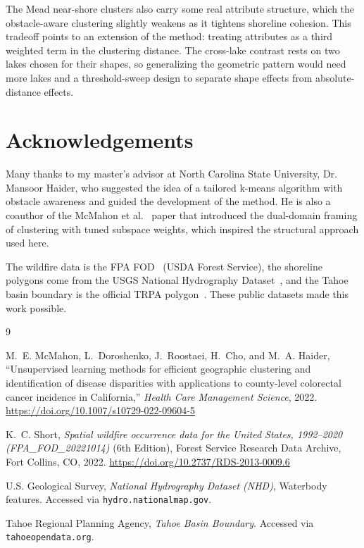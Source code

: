 \documentclass[11pt]{article}
\begin{document}
The Mead near-shore clusters also carry some real attribute structure, which the obstacle-aware clustering slightly weakens as it tightens shoreline cohesion. This tradeoff points to an extension of the method: treating attributes as a third weighted term in the clustering distance. The cross-lake contrast rests on two lakes chosen for their shapes, so generalizing the geometric pattern would need more lakes and a threshold-sweep design to separate shape effects from absolute-distance effects.

\section*{Acknowledgements}

Many thanks to my master's advisor at North Carolina State University, Dr. Mansoor Haider, who suggested the idea of a tailored k-means algorithm with obstacle awareness and guided the development of the method. He is also a coauthor of the McMahon et al.~\cite{mcmahon2022} paper that introduced the dual-domain framing of clustering with tuned subspace weights, which inspired the structural approach used here.

The wildfire data is the FPA FOD~\cite{fpafod} (USDA Forest Service), the shoreline polygons come from the USGS National Hydrography Dataset~\cite{nhd}, and the Tahoe basin boundary is the official TRPA polygon~\cite{trpa}. These public datasets made this work possible.

\begin{thebibliography}{9}

M.~E. McMahon, L.~Doroshenko, J.~Roostaei, H.~Cho, and M.~A. Haider,
``Unsupervised learning methods for efficient geographic clustering and identification of disease disparities with applications to county-level colorectal cancer incidence in California,''
\emph{Health Care Management Science}, 2022. \url{https://doi.org/10.1007/s10729-022-09604-5}

K.~C. Short,
\emph{Spatial wildfire occurrence data for the United States, 1992--2020 (FPA\_FOD\_20221014)} (6th Edition), Forest Service Research Data Archive, Fort Collins, CO, 2022. \url{https://doi.org/10.2737/RDS-2013-0009.6}

U.S. Geological Survey,
\emph{National Hydrography Dataset (NHD)}, Waterbody features. Accessed via \texttt{hydro.nationalmap.gov}.

Tahoe Regional Planning Agency,
\emph{Tahoe Basin Boundary}. Accessed via \texttt{tahoeopendata.org}.

\end{thebibliography}
\end{document}
